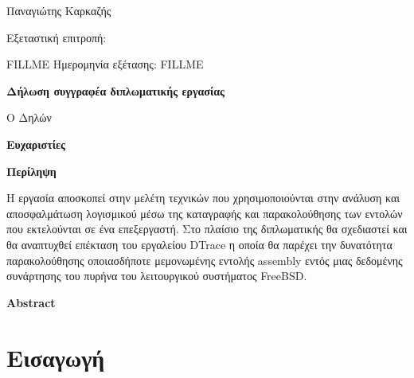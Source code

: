 \documentclass[12pt]{article}
\begin{document}
\begin{center}
Παναγιώτης Καρκαζής %
\end{center}

Εξεταστική επιτροπή:

\begin{center}
FILLME %
\linebreak
\linebreak
Ημερομηνία εξέτασης: FILLME %
\end{center}

\pagebreak
\shipout\null

\begin{center}
\textbf{Δήλωση συγγραφέα διπλωματικής εργασίας}
\end{center}


\begin{center}
Ο Δηλών

\end{center}

\pagebreak
\shipout\null

\begin{center}
\textbf{Ευχαριστίες}
\end{center}


\pagebreak
\shipout\null

\begin{center}
\textbf{Περίληψη}
\end{center}

Η εργασία αποσκοπεί στην μελέτη τεχνικών που χρησιμοποιούνται στην ανάλυση και
αποσφαλμάτωση λογισμικού μέσω της καταγραφής και παρακολούθησης των εντολών που
εκτελούνται σε ένα επεξεργαστή. Στο πλαίσιο της διπλωματικής θα σχεδιαστεί και
θα αναπτυχθεί επέκταση του εργαλείου DTrace η οποία θα παρέχει την δυνατότητα
παρακολούθησης οποιασδήποτε μεμονωμένης εντολής assembly εντός μιας δεδομένης
συνάρτησης του πυρήνα του λειτουργικού συστήματος FreeBSD.

\begin{center}
\textbf{Abstract}
\end{center}


\pagebreak

\renewcommand{\contentsname}{Περιεχόμενα}
\tableofcontents
\pagebreak

\section{Εισαγωγή}


\renewcommand{\refname}{Βιβλιογραφία}
\begin{thebibliography}{00}
\end{thebibliography}
\end{document}
